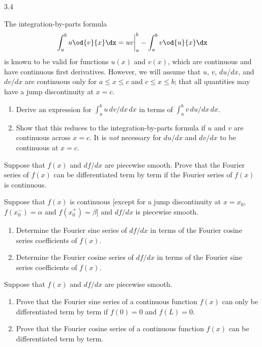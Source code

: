 \begin{exercises}{3.4}
\item The integration-by-parts formula
\[
\int_a^b u \od{v}{x} \dx = uv \bigg|_a^b - \int_a^b v \od{u}{x} \dx
\]
is known to be valid for functions $u(x)$ and $v(x)$, which are continuous and have continuous first derivatives.  However, we will assume that $u$, $v$, $du/dx$, and $dv/dx$ are continuous only for $a \le x \le c$ and $c \le x \le b$; that all quantities may have a jump discontinuity at $x = c$.
\begin{enumerate}
\item[\starred\textbf{(a)}] Derive an expression for $\int_a^b u\,dv/dx\,dx$ in terms of $\int_a^b v\,du/dx\,dx$.
\item[\textbf{(b)}] Show that this reduces to the integration-by-parts formula if $u$ and $v$ are continuous across $x = c$.  It is \textit{not} necessary for $du/dx$ and $dv/dx$ to be continuous at $x = c$.
\end{enumerate}

\item Suppose that $f(x)$ and $df/dx$ are piecewise smooth.  Prove that the Fourier series of $f(x)$ can be differentiated term by term if the Fourier series of $f(x)$ is continuous.

\item Suppose that $f(x)$ is continuous [except for a jump discontinuity at $x = x_0$, $f(x_0^-) = \alpha$ and $f(x_0^+) = \beta$] and $df/dx$ is piecewise smooth.
\begin{enumerate}
\item[\starred\textbf{(a)}] Determine the Fourier sine series of $df/dx$ in terms of the Fourier cosine series coefficients of $f(x)$.
\item[\textbf{(b)}] Determine the Fourier cosine series of $df/dx$ in terms of the Fourier sine series coefficients of $f(x)$.
\end{enumerate}

\item Suppose that $f(x)$ and $df/dx$ are piecewise smooth.
\begin{enumerate}
\item[\textbf{(a)}] Prove that the Fourier sine series of a continuous function $f(x)$ can only be differentiated term by term if $f(0) = 0$ and $f(L) = 0$.
\item[\textbf{(b)}] Prove that the Fourier cosine series of a continuous function $f(x)$ can be differentiated term by term.
\end{enumerate}


\end{exercises}
